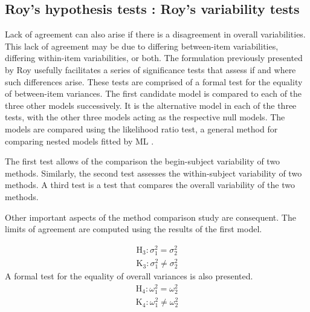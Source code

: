 \documentclass[12pt, a4paper]{report}
\theoremstyle{plain}
\theoremstyle{definition}
\theoremstyle{remark}
\begin{document}
	

	\subsection{Roy's hypothesis tests : Roy's variability tests}
	
	Lack of agreement can also arise if there is a disagreement in overall variabilities. This lack of agreement may be due to differing between-item variabilities, differing within-item variabilities, or both. The formulation previously presented by Roy usefully facilitates a series of significance tests that assess if and where such differences arise. These tests are comprised of a formal test for the equality of between-item variances.
		The first candidate model is compared to each of the three other models successively. It is the alternative model in each of the three tests, with the other three models acting as the respective null models. The models are compared using the likelihood ratio test, a general method for comparing nested models fitted by ML \citep{Lehmann2006}.
		
		
		
		The first test allows of the comparison the begin-subject variability of two methods. Similarly, the second test
		assesses the within-subject variability of two methods. A third test is a test that compares the overall variability of the two methods.
		
		Other important aspects of the method comparison study are consequent. The limits of agreement are computed using the results of the first model.
	
	
	\begin{eqnarray*}
		\operatorname{H_3} : \sigma^2_1 = \sigma^2_2 \\
		\operatorname{K_3} : \sigma^2_1 \neq \sigma^2_2
	\end{eqnarray*}
	A formal test for the equality of overall variances is also presented.
	\begin{eqnarray*}
		\operatorname{H_4} : \omega^2_1 = \omega^2_2 \\
		\operatorname{K_4} : \omega^2_1 \neq \omega^2_2
	\end{eqnarray*}
\end{document}

